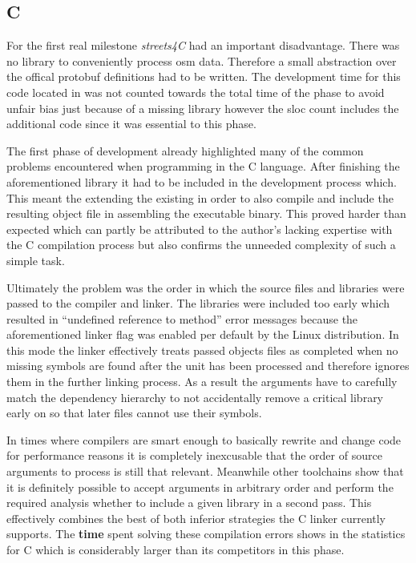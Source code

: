 \subsection{C}
\label{subsec:Implementation::Counting::C}

For the first real milestone \textit{streets4C} had an important disadvantage. There was no library to conveniently process \gls{osm} data. Therefore a small abstraction over the offical \gls{protobuf} definitions had to be written. The development time for this code located in  was not counted towards the total time of the phase to avoid unfair bias just because of a missing library however the \gls{sloc} count includes the additional code since it was essential to this phase.

The first phase of development already highlighted many of the common problems encountered when programming in the C language. After finishing the aforementioned library it had to be included in the development process which. This meant the extending the existing  in order to also compile  and include the resulting object file in assembling the executable binary. This proved harder than expected which can partly be attributed to the author's lacking expertise with the C compilation process but also confirms the unneeded complexity of such a simple task.

Ultimately the problem was the order in which the source files and libraries were passed to the compiler and linker. The libraries were included too early which resulted in ``undefined reference to method'' error messages because the aforementioned linker flag  was enabled per default by the Linux distribution. In this mode the linker effectively treats passed objects files as completed when no missing symbols are found after the unit has been processed and therefore ignores them in the further linking process. As a result the arguments have to carefully match the dependency hierarchy to not accidentally remove a critical library early on so that later files cannot use their symbols.

In times where compilers are smart enough to basically rewrite and change code for performance reasons it is completely inexcusable that the order of source arguments to process is still that relevant. Meanwhile other toolchains show that it is definitely possible to accept arguments in arbitrary order and perform the required analysis whether to include a given library in a second pass. This effectively combines the best of both inferior strategies the C linker currently supports. The \textbf{time} spent solving these compilation errors shows in the statistics for C which is considerably larger than its competitors in this phase.

